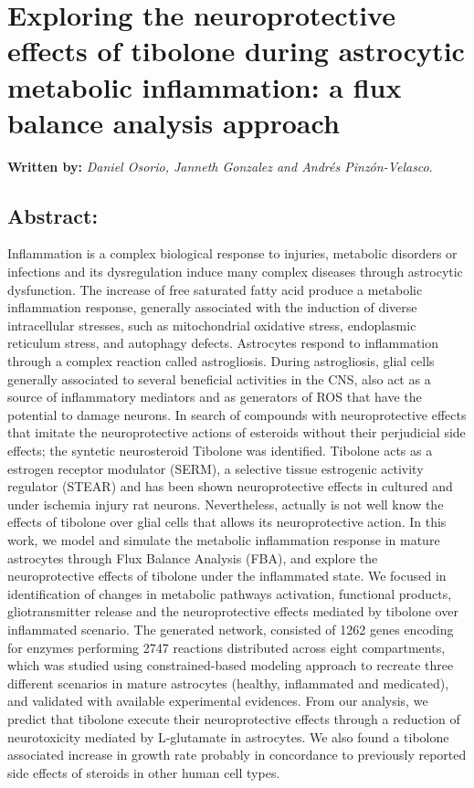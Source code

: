 \chapter{Exploring the neuroprotective effects of tibolone during astrocytic metabolic inflammation: a flux balance analysis approach}
\textbf{Written by:} \textit{Daniel Osorio, Janneth Gonzalez and Andrés Pinzón-Velasco}.
\section*{Abstract:}
Inflammation is a complex biological response to injuries, metabolic disorders or infections and its dysregulation induce many complex diseases through astrocytic dysfunction. The increase of free saturated fatty acid produce a metabolic inflammation response, generally associated with the induction of diverse intracellular stresses, such as mitochondrial oxidative stress, endoplasmic reticulum stress, and autophagy defects.  Astrocytes respond to inflammation through a complex reaction called astrogliosis. During astrogliosis, glial cells generally associated to several beneficial activities in the CNS, also act as a source of inflammatory mediators and as generators of ROS that have the potential to damage neurons. In search of compounds with neuroprotective effects that imitate the neuroprotective actions of esteroids without their perjudicial side effects; the syntetic neurosteroid Tibolone was identified. Tibolone acts as a estrogen receptor modulator (SERM), a selective tissue estrogenic activity regulator (STEAR) and has been shown neuroprotective effects in cultured and under ischemia injury rat neurons. Nevertheless, actually is not well know the effects of tibolone over glial cells that allows its neuroprotective action. In this work, we model and simulate the metabolic inflammation response in mature astrocytes through Flux Balance Analysis (FBA), and explore the neuroprotective effects of tibolone under the inflammated state. We focused in identification of changes in metabolic pathways activation, functional products, gliotransmitter release and the neuroprotective effects mediated by tibolone over inflammated scenario. The generated network, consisted of 1262 genes encoding for enzymes performing 2747 reactions distributed across eight compartments, which was studied using constrained-based modeling approach to recreate three different scenarios in mature astrocytes (healthy, inflammated and medicated), and validated with available experimental evidences. From our analysis, we predict that tibolone execute their neuroprotective effects through a reduction of neurotoxicity mediated by L-glutamate in astrocytes. We also found a tibolone associated increase in growth rate probably in concordance to previously reported side effects of steroids in other human cell types.
